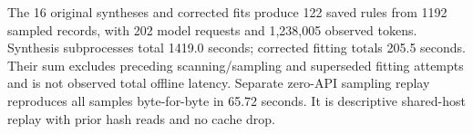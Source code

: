 The 16 original syntheses and corrected fits produce 122 saved rules from 1192 sampled records, with 202 model requests and 1,238,005 observed tokens. Synthesis subprocesses total 1419.0 seconds; corrected fitting totals 205.5 seconds. Their sum excludes preceding scanning/sampling and superseded fitting attempts and is not observed total offline latency.
Separate zero-API sampling replay reproduces all samples byte-for-byte in 65.72 seconds. It is descriptive shared-host replay with prior hash reads and no cache drop.
